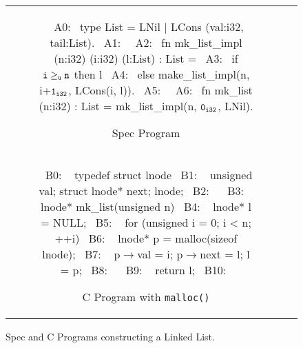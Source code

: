 \begin{figure}[H]
\begin{tabular}{cc}
\begin{subfigure}[b]{\textwidth}
\begin{center}
\begin{allLangEnvFoot}
~{\scriptsize \textcolor{mygray}{A0:}}~ type List = LNil | LCons (val:i32, tail:List).
~{\scriptsize \textcolor{mygray}{A1:}}~
~{\scriptsize \textcolor{mygray}{A2:}}~ fn mk_list_impl (n:i32) (i:i32) (l:List) : List =
~{\scriptsize \textcolor{mygray}{A3:}}~    if ${\tt i \geq_u n}$ then l
~{\scriptsize \textcolor{mygray}{A4:}}~             else make_list_impl(n, i+${\tt 1_{i32}}$, LCons(i, l)).
~{\scriptsize \textcolor{mygray}{A5:}}~
~{\scriptsize \textcolor{mygray}{A6:}}~ fn mk_list (n:i32) : List = mk_list_impl(n, ${\tt 0_{i32}}$, LNil).
\end{allLangEnvFoot}
\end{center}
\caption{\label{fig:llAllocSpec}Spec Program}
\end{subfigure}%
\\
\begin{subfigure}[b]{\textwidth}
\begin{center}
\begin{allLangEnvFoot}
~{\scriptsize \textcolor{mygray}{B0: }}~ typedef struct lnode {
~{\scriptsize \textcolor{mygray}{B1: }}~   unsigned val; struct lnode* next; } lnode;
~{\scriptsize \textcolor{mygray}{B2: }}~ 
~{\scriptsize \textcolor{mygray}{B3: }}~ lnode* mk_list(unsigned n) {
~{\scriptsize \textcolor{mygray}{B4: }}~   lnode* l = NULL;
~{\scriptsize \textcolor{mygray}{B5: }}~   for (unsigned i = 0; i < n; ++i) {
~{\scriptsize \textcolor{mygray}{B6: }}~     lnode* p = malloc(sizeof lnode);
~{\scriptsize \textcolor{mygray}{B7: }}~     p$\rightarrow$val = i; p$\rightarrow$next = l; l = p;
~{\scriptsize \textcolor{mygray}{B8: }}~   }
~{\scriptsize \textcolor{mygray}{B9: }}~   return l;
~{\scriptsize \textcolor{mygray}{B10:}}~ }
\end{allLangEnvFoot}
\end{center}
\caption{\label{fig:llAllocC}C Program with {\tt malloc()}}
\end{subfigure}%
\\
\end{tabular}
\caption{\label{fig:llAllocSpecAndC}Spec and C Programs constructing a Linked List.}
\end{figure}
